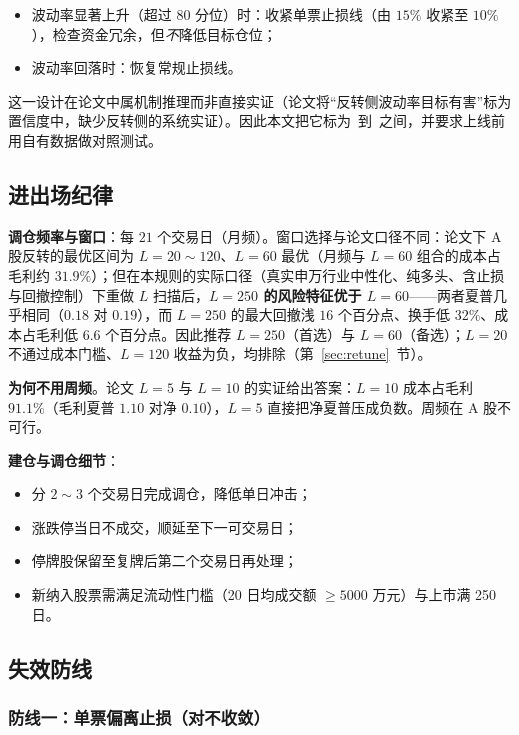\begin{itemize}[leftmargin=2.2em]
  \item 波动率显著上升（超过 80 分位）时：收紧单票止损线（由 $15\%$ 收紧至 $10\%$），检查资金冗余，但\emph{不}降低目标仓位；
  \item 波动率回落时：恢复常规止损线。
\end{itemize}

这一设计在论文中属机制推理而非直接实证（论文将“反转侧波动率目标有害”标为置信度中，缺少反转侧的系统实证）。因此本文把它标为\conflow~到\confmid~之间，并要求上线前用自有数据做对照测试。

\subsection{进出场纪律}

\textbf{调仓频率与窗口}：每 $21$ 个交易日（月频）。窗口选择与论文口径不同：论文下 A 股反转的最优区间为 $L=20\sim120$、$L=60$ 最优（月频与 $L=60$ 组合的成本占毛利约 $31.9\%$）；但在本规则的实际口径（真实申万行业中性化、纯多头、含止损与回撤控制）下重做 $L$ 扫描后，\textbf{$L=250$ 的风险特征优于 $L=60$}——两者夏普几乎相同（$0.18$ 对 $0.19$），而 $L=250$ 的最大回撤浅 $16$ 个百分点、换手低 $32\%$、成本占毛利低 $6.6$ 个百分点。因此推荐 $L=250$（首选）与 $L=60$（备选）；$L=20$ 不通过成本门槛、$L=120$ 收益为负，均排除（第~\ref{sec:retune}~节）。

\textbf{为何不用周频}。论文 $L=5$ 与 $L=10$ 的实证给出答案：$L=10$ 成本占毛利 $91.1\%$（毛利夏普 $1.10$ 对净 $0.10$），$L=5$ 直接把净夏普压成负数。周频在 A 股不可行。

\textbf{建仓与调仓细节}：
\begin{itemize}[leftmargin=2.2em]
  \item 分 $2\sim3$ 个交易日完成调仓，降低单日冲击；
  \item 涨跌停当日不成交，顺延至下一可交易日；
  \item 停牌股保留至复牌后第二个交易日再处理；
  \item 新纳入股票需满足流动性门槛（20 日均成交额 $\ge5000$ 万元）与上市满 250 日。
\end{itemize}

\subsection{失效防线}

\subsubsection*{防线一：单票偏离止损（对不收敛）}

